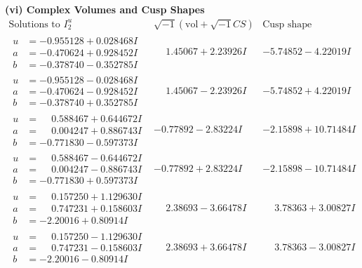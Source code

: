 \documentclass[1p]{elsarticle_modified}
\theoremstyle{definition}
\newcommand{\I}{\sqrt{-1}}
\begin{document}
\newpage\flushleft \textbf{(vi) Complex Volumes and Cusp Shapes}
$$\begin{array}{c|c|c}  
\text{Solutions to }I^u_{2}& \I (\text{vol} + \sqrt{-1}CS) & \text{Cusp shape}\\
 \hline 
\begin{aligned}
u &= -0.955128 + 0.028468 I \\
a &= -0.470624 + 0.928452 I \\
b &= -0.378740 - 0.352785 I\end{aligned}
 & \phantom{-}1.45067 + 2.23926 I & -5.74852 - 4.22019 I \\ \hline\begin{aligned}
u &= -0.955128 - 0.028468 I \\
a &= -0.470624 - 0.928452 I \\
b &= -0.378740 + 0.352785 I\end{aligned}
 & \phantom{-}1.45067 - 2.23926 I & -5.74852 + 4.22019 I \\ \hline\begin{aligned}
u &= \phantom{-}0.588467 + 0.644672 I \\
a &= \phantom{-}0.004247 + 0.886743 I \\
b &= -0.771830 - 0.597373 I\end{aligned}
 & -0.77892 - 2.83224 I & -2.15898 + 10.71484 I \\ \hline\begin{aligned}
u &= \phantom{-}0.588467 - 0.644672 I \\
a &= \phantom{-}0.004247 - 0.886743 I \\
b &= -0.771830 + 0.597373 I\end{aligned}
 & -0.77892 + 2.83224 I & -2.15898 - 10.71484 I \\ \hline\begin{aligned}
u &= \phantom{-}0.157250 + 1.129630 I \\
a &= \phantom{-}0.747231 + 0.158603 I \\
b &= -2.20016 + 0.80914 I\end{aligned}
 & \phantom{-}2.38693 - 3.66478 I & \phantom{-}3.78363 + 3.00827 I \\ \hline\begin{aligned}
u &= \phantom{-}0.157250 - 1.129630 I \\
a &= \phantom{-}0.747231 - 0.158603 I \\
b &= -2.20016 - 0.80914 I\end{aligned}
 & \phantom{-}2.38693 + 3.66478 I & \phantom{-}3.78363 - 3.00827 I \\ \hline\begin{aligned}

\end{aligned}
\end{array}$$
\end{document}

